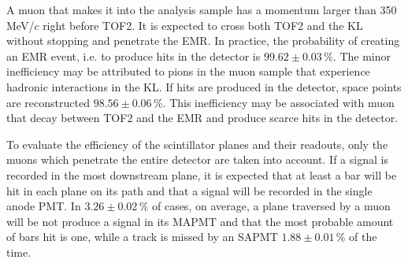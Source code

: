 
A muon that makes it into the analysis sample has a momentum larger than 350\,MeV/$c$ right before TOF2. It is expected to cross both TOF2 and the KL without stopping and penetrate the EMR. In practice, the probability of creating an EMR event, i.e. to produce hits in the detector is $99.62\pm0.03\,\%$. The minor inefficiency may be attributed to pions in the muon sample that experience hadronic interactions in the KL. If hits are produced in the detector, space points are reconstructed $98.56\pm0.06\,\%$. This inefficiency may be associated with muon that decay between TOF2 and the EMR and produce scarce hits in the detector.

To evaluate the efficiency of the scintillator planes and their readouts, only the muons which penetrate the entire detector are taken into account. If a signal is recorded in the most downstream plane, it is expected that at least a bar will be hit in each plane on its path and that a signal will be recorded in the single anode PMT.
In $3.26\pm0.02\,\%$ of cases, on average, a plane traversed by a muon will be not produce a signal in its MAPMT and that the most probable amount of bars hit is one, while
a track is missed by an SAPMT $1.88\pm0.01\,\%$ of the time. 

%

